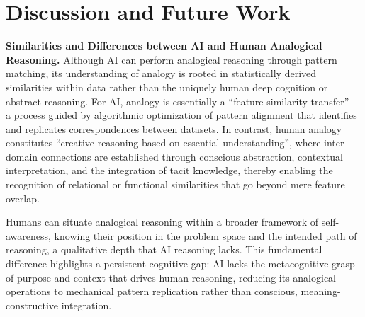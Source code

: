 \section{Discussion and Future Work}

\textbf{Similarities and Differences between AI and Human Analogical Reasoning.}
Although AI can perform analogical reasoning through pattern matching\cite{gentner1983structure, gentner2011computational}, its understanding of analogy is rooted in statistically derived similarities within data rather than the uniquely human deep cognition or abstract reasoning\cite{webb2023emergent}. For AI, analogy is essentially a ``feature similarity transfer''— a process guided by algorithmic optimization of pattern alignment that identifies and replicates correspondences between datasets. In contrast, human analogy constitutes ``creative reasoning based on essential understanding''\cite{rangel2008framework, beaty2023associative, olsson2024analogies, weaver2010transformation}, where inter-domain connections are established through conscious abstraction, contextual interpretation, and the integration of tacit knowledge, thereby enabling the recognition of relational or functional similarities that go beyond mere feature overlap.  

Humans can situate analogical reasoning within a broader framework of self-awareness\cite{moreno2016overcoming, chan2011benefits}, knowing their position in the problem space and the intended path of reasoning\cite{cemri2025multi}, a qualitative depth that AI reasoning lacks. This fundamental difference highlights a persistent cognitive gap: AI lacks the metacognitive grasp of purpose and context that drives human reasoning\cite{ball2019advancing}, reducing its analogical operations to mechanical pattern replication rather than conscious, meaning-constructive integration. 

